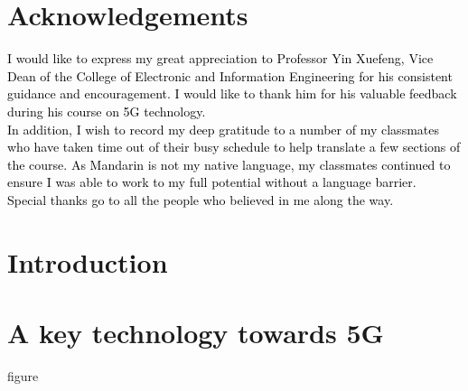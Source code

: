 \documentclass[12pt]{report}
\renewcommand{\figureautorefname}{figure} %
\begin{document}

    


    \chapter*{Acknowledgements}
    \textcolor{black}{I would like to express my great appreciation to Professor Yin Xuefeng, Vice Dean of the College of Electronic and Information Engineering for his consistent guidance and encouragement. I would like to thank him for his valuable feedback during his course on 5G technology.}\\
    
    \textcolor{black}{In addition, I wish to record my deep gratitude to a number of my classmates who have taken time out of their busy schedule to help translate a few sections of the course. As Mandarin is not my native language, my classmates continued to ensure I was able to work to my full potential without a language barrier.}\\
    
   
   \textcolor{black}{Special thanks go to all the people who believed in me along the way.}
    

    {\hypersetup{linkcolor=black}
        \tableofcontents
        \listoffigures
    }
        {\hypersetup{linkcolor=mycolor}}
    
    \chapter{Introduction} 
    
     
    \chapter{A key technology towards 5G}
    
    \figureautorefname
    
\end{document}
